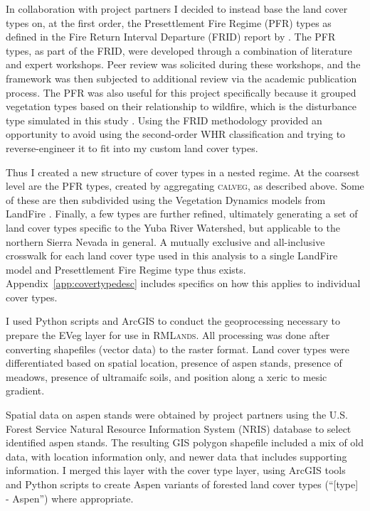 In collaboration with project partners I decided to instead base the land cover types on, at the first order, the Presettlement Fire Regime (PFR) types as defined in the Fire Return Interval Departure (FRID) report by \citet{VandeWater2011}. The PFR types, as part of the FRID, were developed through a combination of literature and expert workshops. Peer review was solicited during these workshops, and the framework was then subjected to additional review via the academic publication process. The PFR was also useful for this project specifically because it grouped vegetation types based on their relationship to wildfire, which is the disturbance type simulated in this study \citep{VandeWater2011}. Using the FRID methodology provided an opportunity to avoid using the second-order WHR classification and trying to reverse-engineer it to fit into my custom land cover types. 

Thus I created a new structure of cover types in a nested regime. At the coarsest level are the PFR types, created by aggregating \textsc{calveg}, as described above. Some of these are then subdivided using the Vegetation Dynamics models from LandFire \citep{Landfire2007}. Finally, a few types are further refined, ultimately generating a set of land cover types specific to the Yuba River Watershed, but applicable to the northern Sierra Nevada in general. A mutually exclusive and all-inclusive crosswalk for each land cover type used in this analysis to a single LandFire model and Presettlement Fire Regime type thus exists. Appendix~\ref{app:covertypedesc} includes specifics on how this applies to individual cover types.

            
I used Python \citep{Python26} scripts and ArcGIS  to conduct the geoprocessing necessary to prepare the EVeg layer for use in \textsc{RMLands}. All processing was done after converting shapefiles (vector data) to the raster format. Land cover types were differentiated based on spatial location, presence of aspen stands, presence of meadows, presence of ultramaifc soils, and position along a xeric to mesic gradient. 

Spatial data on aspen stands were obtained by project partners using the U.S. Forest Service Natural Resource Information System (NRIS) database to select identified aspen stands. The resulting GIS polygon shapefile included a mix of old data, with location information only, and newer data that includes supporting information. I merged this layer with the cover type layer, using ArcGIS tools and Python scripts to create Aspen variants of forested land cover types (``[type] - Aspen'') where appropriate.

